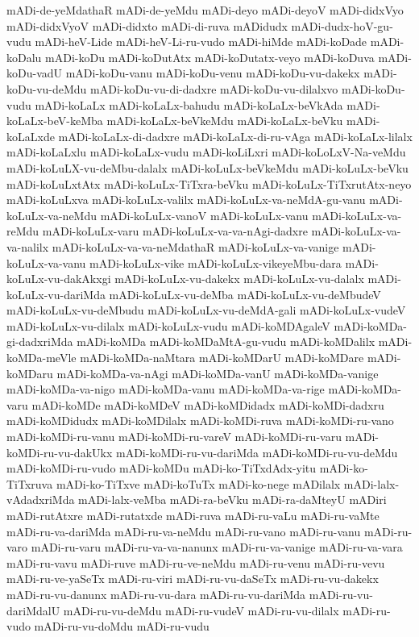 {mADi-de-yeMdathaR
mADi-de-yeMdu
mADi-deyo
mADi-deyoV
mADi-didxVyo
mADi-didxVyoV
mADi-didxto
mADi-di-ruva
mADidudx
mADi-dudx-hoV-gu-vudu
mADi-heV-Lide
mADi-heV-Li-ru-vudo
mADi-hiMde
mADi-koDade
mADi-koDalu
mADi-koDu
mADi-koDutAtx
mADi-koDutatx-veyo
mADi-koDuva
mADi-koDu-vadU
mADi-koDu-vanu
mADi-koDu-venu
mADi-koDu-vu-dakekx
mADi-koDu-vu-deMdu
mADi-koDu-vu-di-dadxre
mADi-koDu-vu-dilalxvo
mADi-koDu-vudu
mADi-koLaLx
mADi-koLaLx-bahudu
mADi-koLaLx-beVkAda
mADi-koLaLx-beV-keMba
mADi-koLaLx-beVkeMdu
mADi-koLaLx-beVku
mADi-koLaLxde
mADi-koLaLx-di-dadxre
mADi-koLaLx-di-ru-vAga
mADi-koLaLx-lilalx
mADi-koLaLxlu
mADi-koLaLx-vudu
mADi-koLiLxri
mADi-koLoLxV-Na-veMdu
mADi-koLuLX-vu-deMbu-dalalx
mADi-koLuLx-beVkeMdu
mADi-koLuLx-beVku
mADi-koLuLxtAtx
mADi-koLuLx-TiTxra-beVku
mADi-koLuLx-TiTxrutAtx-neyo
mADi-koLuLxva
mADi-koLuLx-valilx
mADi-koLuLx-va-neMdA-gu-vanu
mADi-koLuLx-va-neMdu
mADi-koLuLx-vanoV
mADi-koLuLx-vanu
mADi-koLuLx-va-reMdu
mADi-koLuLx-varu
mADi-koLuLx-va-va-nAgi-dadxre
mADi-koLuLx-va-va-nalilx
mADi-koLuLx-va-va-neMdathaR
mADi-koLuLx-va-vanige
mADi-koLuLx-va-vanu
mADi-koLuLx-vike
mADi-koLuLx-vikeyeMbu-dara
mADi-koLuLx-vu-dakAkxgi
mADi-koLuLx-vu-dakekx
mADi-koLuLx-vu-dalalx
mADi-koLuLx-vu-dariMda
mADi-koLuLx-vu-deMba
mADi-koLuLx-vu-deMbudeV
mADi-koLuLx-vu-deMbudu
mADi-koLuLx-vu-deMdA-gali
mADi-koLuLx-vudeV
mADi-koLuLx-vu-dilalx
mADi-koLuLx-vudu
mADi-koMDAgaleV
mADi-koMDa-gi-dadxriMda
mADi-koMDa
mADi-koMDaMtA-gu-vudu
mADi-koMDalilx
mADi-koMDa-meVle
mADi-koMDa-naMtara
mADi-koMDarU
mADi-koMDare
mADi-koMDaru
mADi-koMDa-va-nAgi
mADi-koMDa-vanU
mADi-koMDa-vanige
mADi-koMDa-va-nigo
mADi-koMDa-vanu
mADi-koMDa-va-rige
mADi-koMDa-varu
mADi-koMDe
mADi-koMDeV
mADi-koMDidadx
mADi-koMDi-dadxru
mADi-koMDidudx
mADi-koMDilalx
mADi-koMDi-ruva
mADi-koMDi-ru-vano
mADi-koMDi-ru-vanu
mADi-koMDi-ru-vareV
mADi-koMDi-ru-varu
mADi-koMDi-ru-vu-dakUkx
mADi-koMDi-ru-vu-dariMda
mADi-koMDi-ru-vu-deMdu
mADi-koMDi-ru-vudo
mADi-koMDu
mADi-ko-TiTxdAdx-yitu
mADi-ko-TiTxruva
mADi-ko-TiTxve
mADi-koTuTx
mADi-ko-nege
mADilalx
mADi-lalx-vAdadxriMda
mADi-lalx-veMba
mADi-ra-beVku
mADi-ra-daMteyU
mADiri
mADi-rutAtxre
mADi-rutatxde
mADi-ruva
mADi-ru-vaLu
mADi-ru-vaMte
mADi-ru-va-dariMda
mADi-ru-va-neMdu
mADi-ru-vano
mADi-ru-vanu
mADi-ru-varo
mADi-ru-varu
mADi-ru-va-va-nanunx
mADi-ru-va-vanige
mADi-ru-va-vara
mADi-ru-vavu
mADi-ruve
mADi-ru-ve-neMdu
mADi-ru-venu
mADi-ru-vevu
mADi-ru-ve-yaSeTx
mADi-ru-viri
mADi-ru-vu-daSeTx
mADi-ru-vu-dakekx
mADi-ru-vu-danunx
mADi-ru-vu-dara
mADi-ru-vu-dariMda
mADi-ru-vu-dariMdalU
mADi-ru-vu-deMdu
mADi-ru-vudeV
mADi-ru-vu-dilalx
mADi-ru-vudo
mADi-ru-vu-doMdu
mADi-ru-vudu
}
